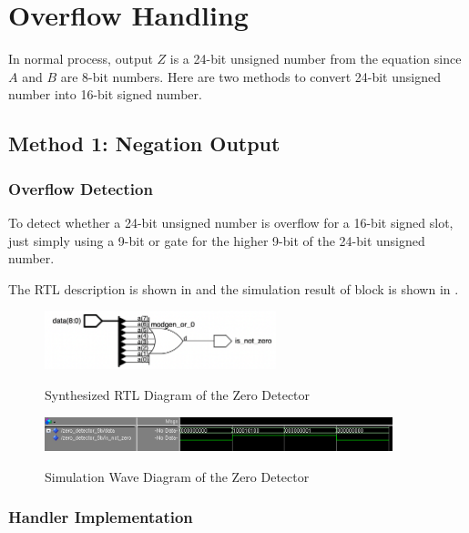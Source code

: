 \section{Overflow Handling}

In normal process, output \(Z\) is a 24-bit unsigned number from the equation since \(A\) and \(B\) are 8-bit numbers.
Here are two methods to convert 24-bit unsigned number into 16-bit signed number.

\subsection{Method 1: Negation Output}

\subsubsection{Overflow Detection}

To detect whether a 24-bit unsigned number is overflow for a 16-bit signed slot,
just simply using a 9-bit or gate for the higher 9-bit of the 24-bit unsigned number.

The RTL description is shown in  and the simulation result of block is shown in .

\begin{figure}[!ht]
	\centering
	\caption{Synthesized RTL Diagram of the Zero Detector}
	\includegraphics[width=0.6\textwidth]{../img/zero_det_rtl.png}
	\label{fig:zero_det_rtl}
\end{figure}

\begin{figure}[!ht]
	\centering
	\caption{Simulation Wave Diagram of the Zero Detector}
	\includegraphics[width=0.9\textwidth]{../img/zero_det_sim.png}
	\label{fig:zero_det_sim}
\end{figure}

\subsubsection{Handler Implementation}

